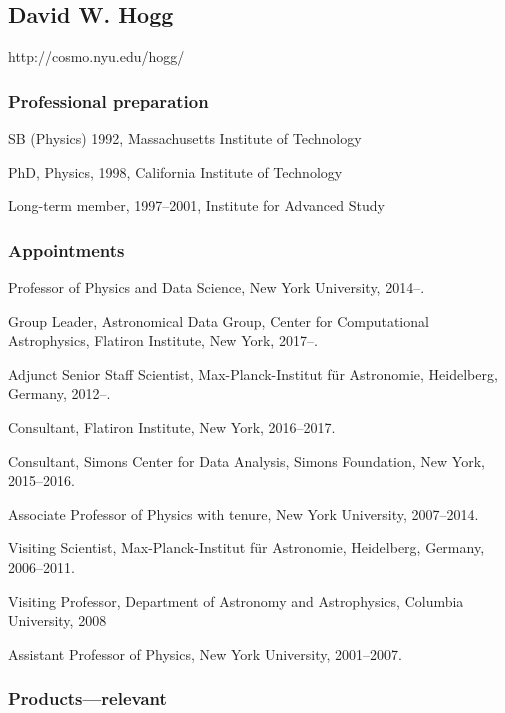 \documentclass[12pt, fullpage, letterpaper]{article}
\begin{document}
\subsection*{David W. Hogg}
\noindent http://cosmo.nyu.edu/hogg/

\subsubsection*{Professional preparation}
\begin{list}{}{\hogglist}
\item
SB (Physics) 1992, Massachusetts Institute of Technology
\item
PhD, Physics, 1998, California Institute of Technology
\item
Long-term member, 1997--2001, Institute for Advanced Study
\end{list}

\subsubsection*{Appointments}
\begin{list}{}{\hogglist}
\item
{} Professor of Physics and Data Science, New York University, 2014--.
\item
{} Group Leader, Astronomical Data Group, Center for Computational Astrophysics,
Flatiron Institute, New York, 2017--.
\item
{} Adjunct Senior Staff Scientist, Max-Planck-Institut f\"ur Astronomie,
Heidelberg, Germany, 2012--.
\item
Consultant, Flatiron Institute, New York, 2016--2017.
\item
Consultant, Simons Center for Data Analysis,
Simons Foundation, New York, 2015--2016.
\item
Associate Professor of Physics with tenure, New York University, 2007--2014.
\item
Visiting Scientist, Max-Planck-Institut f\"ur Astronomie,
Heidelberg, Germany, 2006--2011.
\item
Visiting Professor, Department of Astronomy and Astrophysics, Columbia
University, 2008
\item
Assistant Professor of Physics, New York University, 2001--2007.
\end{list}

\subsubsection*{Products---relevant} %
\end{document}
